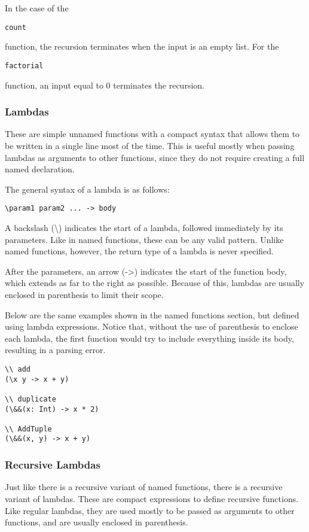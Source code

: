 \documentclass{article}
\def\code#1{\begin{footnotesize}\texttt{#1}\end{footnotesize}}
\begin{document}
In the case of the \code{count} function, the recursion terminates when the input is an empty list.
For the \code{factorial} function, an input equal to 0 terminates the recursion.

\subsubsection{Lambdas}

These are simple unnamed functions with a compact syntax that allows them to be written in a single line most of the time.
This is useful mostly when passing lambdas as arguments to other functions, since they do not require creating a full named declaration.

The general syntax of a lambda is as follows:

\begin{lstlisting}[escapechar=&]
\param1 param2 ... -> body
\end{lstlisting}

A backslash (\textbackslash) indicates the start of a lambda, followed immediately by its parameters.
Like in named functions, these can be any valid pattern.
Unlike named functions, however, the return type of a lambda is never specified.

After the parameters, an arrow (->) indicates the start of the function body, which extends as far to the right as possible.
Because of this, lambdas are usually enclosed in parenthesis to limit their scope.

Below are the same examples shown in the named functions section, but defined using lambda expressions.
Notice that, without the use of parenthesis to enclose each lambda, the first function would try to include everything inside its body, resulting in a parsing error.

\begin{lstlisting}[escapechar=&]
\\ add
(\x y -> x + y)

\\ duplicate
(\&&(x: Int) -> x * 2)

\\ AddTuple
(\&&(x, y) -> x + y)
\end{lstlisting}

\subsubsection{Recursive Lambdas}

Just like there is a recursive variant of named functions, there is a recursive variant of lambdas.
These are compact expressions to define recursive functions.
Like regular lambdas, they are used mostly to be passed as arguments to other functions, and are usually enclosed in parenthesis.
\end{document}
